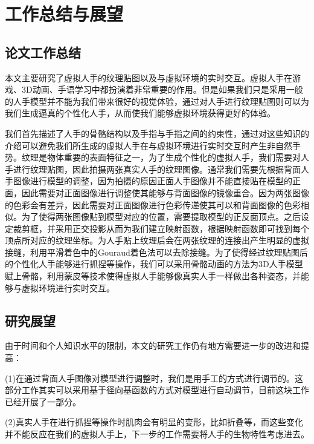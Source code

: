 \chapter{工作总结与展望}

\section{论文工作总结}
本文主要研究了虚拟人手的纹理贴图以及与虚拟环境的实时交互。虚拟人手在游戏、3D动画、手语学习中都扮演着非常重要的作用。但是如果我们只是采用一般的人手模型并不能为我们带来很好的视觉体验，通过对人手进行纹理贴图则可以为我们生成逼真的个性化人手，从而使我们能够虚拟环境获得更好的体验。

我们首先描述了人手的骨骼结构以及手指与手指之间的约束性，通过对这些知识的介绍可以避免我们所生成的虚拟人手在与虚拟环境进行实时交互时产生非自然手势。纹理是物体重要的表面特征之一，为了生成个性化的虚拟人手，我们需要对人手进行纹理贴图，因此拍摄两张真实人手的纹理图像。通常我们需要先根据背面人手图像进行模型的调整，因为拍摄的原因正面人手图像并不能直接贴在模型的正面，因此需要对正面图像进行调整使其能够与背面图像的镜像重合。因为两张图像的色彩会有差异，因此需要对正面图像进行色彩传递使其可以和背面图像的色彩相似。为了使得两张图像贴到模型对应的位置，需要提取模型的正反面顶点。之后设定裁剪框，并采用正交投影从而为我们建立映射函数，根据映射函数即可找到每个顶点所对应的纹理坐标。为人手贴上纹理后会在两张纹理的连接出产生明显的虚拟接缝，利用平滑着色中的Gouraud着色法可以去除接缝。为了使得经过纹理贴图后的个性化人手能够进行抓捏等操作，我们可以采用骨骼动画的方法为3D人手模型赋上骨骼，利用蒙皮等技术使得虚拟人手能够像真实人手一样做出各种姿态，并能够与虚拟环境进行实时交互。

\section{研究展望}
由于时间和个人知识水平的限制，本文的研究工作仍有地方需要进一步的改进和提高：

(1)在通过背面人手图像对模型进行调整时，我们是用手工的方式进行调节的。这部分工作其实可以采用基于径向基函数的方式对模型进行自动调节，目前这块工作已经开展了一部分。

(2)真实人手在进行抓捏等操作时肌肉会有明显的变形，比如折叠等，而这些变化并不能反应在我们的虚拟人手上，下一步的工作需要将人手的生物特性考虑进去。
